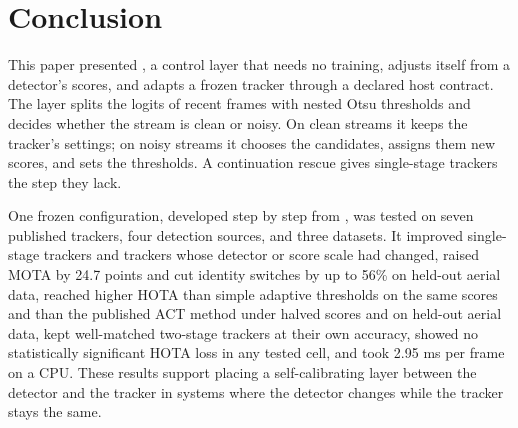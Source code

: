 \section{Conclusion}\label{sec:conclusion}

This paper presented \scl{}, a control layer that needs no training, adjusts
itself from a detector's scores, and adapts a frozen tracker through a
declared host contract. The layer splits the logits of recent frames with
nested Otsu thresholds and decides whether the stream is clean or noisy. On
clean streams it keeps the tracker's settings; on noisy streams it chooses
the candidates, assigns them new scores, and sets the thresholds. A
continuation rescue gives single-stage trackers the step they lack.

One frozen configuration, developed step by step from \aob{}, was tested on
seven published trackers, four detection sources, and three datasets. It
improved single-stage trackers and trackers whose detector or score scale had
changed, raised MOTA by 24.7 points and cut identity switches by up to 56\%
on held-out aerial data, reached higher HOTA than
simple adaptive thresholds on the same scores and than the published ACT
method under halved scores and on held-out aerial data, kept well-matched two-stage
trackers at their own accuracy, showed no statistically significant HOTA loss
in any tested cell, and took 2.95 ms per frame on a CPU. These results support placing a self-calibrating
layer between the detector and the tracker in systems where the detector
changes while the tracker stays the same.
